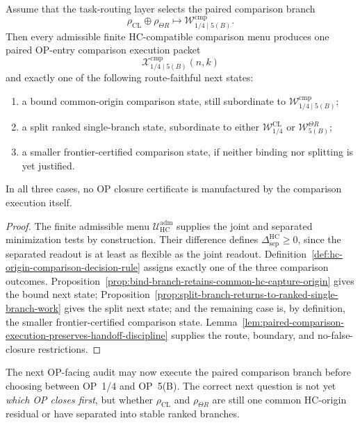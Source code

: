 \begin{theorem}
\label{thm:first-paired-op-entry-comparison-execution-theorem}
Assume that the task-routing layer selects the paired comparison branch
\[
 \rho_{\mathrm{CL}}\oplus\rho_{\Theta R}
 \longmapsto
 \mathcal W_{1/4\mid 5(B)}^{\mathrm{cmp}}.
\]
Then every admissible finite HC-compatible comparison menu produces one paired OP-entry comparison execution packet
\[
 \mathcal X_{1/4\mid 5(B)}^{\mathrm{cmp}}(n,k)
\]
and exactly one of the following route-faithful next states:
\begin{enumerate}[leftmargin=2em,label=(\roman*)]
 \item a bound common-origin comparison state, still subordinate to $\mathcal W_{1/4\mid 5(B)}^{\mathrm{cmp}}$;
 \item a split ranked single-branch state, subordinate to either $\mathcal W_{1/4}^{\mathrm{CL}}$ or $\mathcal W_{5(B)}^{\Theta R}$;
 \item a smaller frontier-certified comparison state, if neither binding nor splitting is yet justified.
\end{enumerate}
In all three cases, no OP closure certificate is manufactured by the comparison execution itself.
\end{theorem}

\begin{proof}
The finite admissible menu $\mathcal U_{\mathrm{HC}}^{\mathrm{adm}}$ supplies the joint and separated minimization tests by construction. Their difference defines $\Delta_{\mathrm{sep}}^{\mathrm{HC}}\geq0$, since the separated readout is at least as flexible as the joint readout. Definition~\ref{def:hc-origin-comparison-decision-rule} assigns exactly one of the three comparison outcomes. Proposition~\ref{prop:bind-branch-retains-common-hc-capture-origin} gives the bound next state; Proposition~\ref{prop:split-branch-returns-to-ranked-single-branch-work} gives the split next state; and the remaining case is, by definition, the smaller frontier-certified comparison state. Lemma~\ref{lem:paired-comparison-execution-preserves-handoff-discipline} supplies the route, boundary, and no-false-closure restrictions.
\end{proof}

\begin{corollary}
\label{cor:v3340-r04-working-rule}
The next OP-facing audit may now execute the paired comparison branch before choosing between OP~1/4 and OP~5(B). The correct next question is not yet \emph{which OP closes first}, but whether $\rho_{\mathrm{CL}}$ and $\rho_{\Theta R}$ are still one common HC-origin residual or have separated into stable ranked branches.
\end{corollary}

